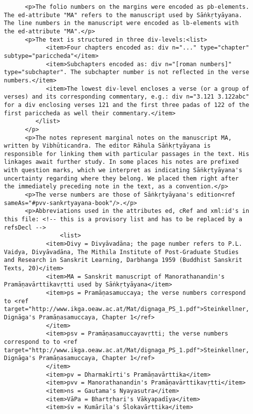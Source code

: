\documentclass[article,12pt,a4paper]{memoir}
\begin{document}
\begin{verbatim}
      <p>The folio numbers on the margins were encoded as pb-elements. The ed-attribute "MA" refers to the manuscript used by Sāṅkṛtyāyana. The line numbers in the manuscript were encoded as lb-elements with the ed-attribute "MA".</p>
      <p>The text is structured in three div-levels:<list>
            <item>Four chapters encoded as: div n="..." type="chapter" subtype="pariccheda"</item>
            <item>Subchapters encoded as: div n="[roman numbers]" type="subchapter". The subchapter number is not reflected in the verse numbers.</item>
            <item>The lowest div-level encloses a verse (or a group of verses) and its corresponding commentary, e.g.: div n="3.121 3.122abc" for a div enclosing verses 121 and the first three padas of 122 of the first pariccheda as well their commentary.</item>
         </list>
      </p>
      <p>The notes represent marginal notes on the manuscript MA, written by Vibhūticandra. The editor Rāhula Sāṅkṛtyāyana is responsible for linking them with particular passages in the text. His linkages await further study. In some places his notes are prefixed with question marks, which we interpret as indicating Sāṅkṛtyāyana's uncertainty regarding where they belong. We placed them right after the immediately preceding note in the text, as a convention.</p>
      <p>The verse numbers are those of Sāṅkṛtyāyana's edition<ref sameAs="#pvv-sankrtyayana-book"/>.</p>
      <p>Abbreviations used in the attributes ed, cRef and xml:id's in this file: <!-- this is a provisory list and has to be replaced by a refsDecl -->
				<list>
            <item>Divy = Divyāvadāna; the page number refers to P.L. Vaidya, Divyāvadāna, The Mithila Institute of Post-Graduate Studies and Research in Sanskrit Learning, Darbhanga 1959 (Buddhist Sanskrit Texts, 20)</item>
            <item>MA = Sanskrit manuscript of Manorathanandin's Pramāṇavārttikavṛtti used by Sāṅkṛtyāyana</item>
            <item>ps = Pramāṇasamuccaya; the verse numbers correspond to <ref target="http://www.ikga.oeaw.ac.at/Mat/dignaga_PS_1.pdf">Steinkellner, Dignāga's Pramāṇasamuccaya, Chapter 1</ref>
            </item>
            <item>psv = Pramāṇasamuccayavṛtti; the verse numbers correspond to to <ref target="http://www.ikga.oeaw.ac.at/Mat/dignaga_PS_1.pdf">Steinkellner, Dignāga's Pramāṇasamuccaya, Chapter 1</ref>
            </item>
            <item>pv = Dharmakīrti's Pramāṇavārttika</item>
            <item>pvv = Manorathanandin's Pramāṇavārttikavṛtti</item>
            <item>ns = Gautama's Nyayasutra</item>
            <item>VāPa = Bhartṛhari's Vākyapadīya</item>
            <item>śv = Kumārila's Ślokavārttika</item>

\end{verbatim}
\end{document}
